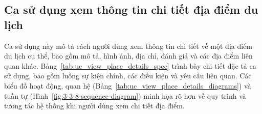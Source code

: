 \subsection{Ca sử dụng xem thông tin chi tiết địa điểm du lịch}
\noindent Ca sử dụng này mô tả cách người dùng xem thông tin chi tiết về một địa điểm du lịch cụ thể, bao gồm mô tả, hình ảnh, địa chỉ, đánh giá và các địa điểm liên quan khác. Bảng~\ref{tab:uc_view_place_details_spec} trình bày chi tiết đặc tả ca sử dụng, bao gồm luồng sự kiện chính, các điều kiện và yêu cầu liên quan. Các biểu đồ hoạt động, quan hệ (Bảng~\ref{tab:uc_view_place_details_diagrams}) và tuần tự (Hình~\ref{fig:3-3-8-sequence-diagram}) minh họa rõ hơn về quy trình và tương tác hệ thống khi người dùng xem chi tiết địa điểm.

